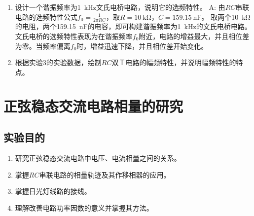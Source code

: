 \documentclass[UTF8]{article}
\begin{document}
\begin{enumerate}[label=\textbf{\arabic*}.]
                    与理论值相差\SI{0.037}{\volt}。
                \item 设计一个谐振频率为\SI{1}{\kilo\hertz}文氏电桥电路，说明它的选频特性。\newline
                A: 由$RC$串联电路的选频特性公式$f_0 = \frac{1}{2\pi RC}$，取$R = \SI{10}{\kilo\ohm}$，$C = \SI{159.15}{\nano\farad}$。
                取两个\SI{10}{\kilo\ohm}的电阻，两个\SI{159.15}{\nano\farad}的电容，即可构建谐振频率为\SI{1}{\kilo\hertz}的文氏电桥电路。
                文氏电桥的选频特性表现为在谐振频率$f_0$附近，电路的增益最大，并且相位差为零。当频率偏离$f_0$时，增益迅速下降，并且相位差开始变化。
                \item 根据实验3的实验数据，绘制$RC$双Ｔ电路的幅频特性，并说明幅频特性的特点。
            \end{enumerate}
    \section{正弦稳态交流电路相量的研究}
        \subsection{实验目的}
            \begin{enumerate}[label=\textbf{\arabic*}.]
                \item 研究正弦稳态交流电路中电压、电流相量之间的关系。
                \item 掌握$RC$串联电路的相量轨迹及其作移相器的应用。 
                \item 掌握日光灯线路的接线。
                \item 理解改善电路功率因数的意义并掌握其方法。
            \end{enumerate}
\end{document}
